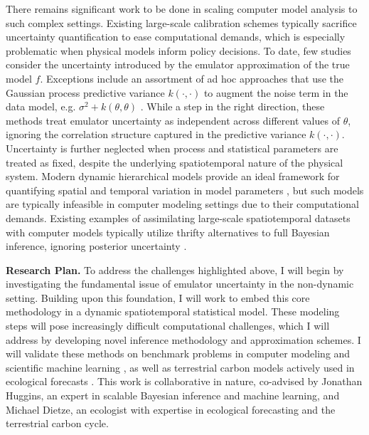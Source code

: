 \documentclass[11pt]{article}
\begin{document}
 There remains significant work to be done in scaling computer model analysis to such complex settings. Existing large-scale calibration schemes typically sacrifice uncertainty quantification to ease computational demands, which is especially problematic when physical models inform policy decisions. To date, few studies consider the uncertainty introduced by the emulator approximation of the true model $f$. Exceptions include an assortment of ad hoc approaches that use the Gaussian process predictive variance $k(\cdot, \cdot)$ to augment the 
 noise term in the data model, e.g. $\sigma^2 + k(\theta, \theta)$ \cite{Fer, Cleary}. While a step in the right direction, these methods treat emulator uncertainty as independent across different values of $\theta$, ignoring the correlation structure captured in the predictive variance $k(\cdot, \cdot)$. Uncertainty is further neglected when process and statistical parameters are treated as fixed, despite the underlying spatiotemporal nature of the physical system. Modern dynamic hierarchical models provide an ideal framework for quantifying spatial and temporal variation in model parameters \cite{Wikle}, but such models are typically infeasible in computer modeling settings due to their computational demands. Existing examples of assimilating large-scale spatiotemporal datasets with computer models typically utilize thrifty alternatives to full Bayesian inference, ignoring posterior uncertainty \cite{Sun}.
 


\noindent
\textbf{Research Plan.} To address the challenges highlighted above, I will begin by investigating the fundamental issue of emulator uncertainty in the 
non-dynamic setting. Building upon this foundation, I will work to embed this core methodology in a dynamic spatiotemporal statistical model. These modeling steps will pose increasingly difficult computational challenges, which I will address by developing novel inference methodology and approximation schemes. I will validate these methods on benchmark problems in computer modeling and scientific machine learning \cite{Surjanovic, Takamoto}, as well as terrestrial carbon models actively used in ecological forecasts \cite{Dietze}. This work is collaborative in nature, co-advised by Jonathan Huggins, an expert in scalable Bayesian inference and machine learning, and Michael Dietze, an ecologist with expertise in ecological forecasting and the terrestrial carbon cycle. 
 
\end{document}
